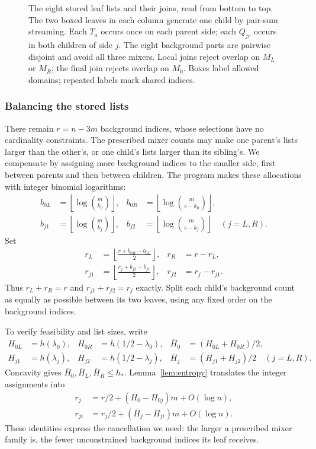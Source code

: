 \begin{figure}[htbp]
\begin{tabular}{@{}cccc@{}}
\end{tabular}
\caption{The eight stored leaf lists and their joins, read from bottom
 to top. The two boxed leaves in each column generate one child by
 pair-sum streaming. Each $T_a$ occurs once on each parent side;
 each $Q_{jr}$ occurs in both children of side $j$. The eight
 background parts are pairwise disjoint and avoid all three mixers.
 Local joins reject overlap on $M_L$ or $M_R$; the final join rejects
 overlap on $M_0$. Boxes label allowed domains; repeated labels mark shared indices.}
\label{tab:leaf-layout}
\end{figure}

\subsubsection*{Balancing the stored lists}

There remain $r=n-3m$ background indices, whose selections have no
cardinality constraints. The prescribed mixer counts may make one
parent's lists larger than the other's, or one child's lists larger
than its sibling's. We compensate by assigning more background indices
to the smaller side, first between parents and then between children.
The program makes these allocations with integer binomial logarithms:
\[
\begin{aligned}
 b_{0L}&=\left\lfloor\log \binom{m}{k_0}\right\rfloor,&
 b_{0R}&=\left\lfloor\log \binom{m}{s-k_0}\right\rfloor,\\
 b_{j1}&=\left\lfloor\log \binom{m}{k_j}\right\rfloor,&
 b_{j2}&=\left\lfloor\log \binom{m}{s-k_j}\right\rfloor
 \quad(j=L,R).
\end{aligned}
\]
Set
\[
\begin{aligned}
 r_L&=\left\lfloor\frac{r+b_{0R}-b_{0L}}2\right\rfloor,
 &r_R&=r-r_L,\\
 r_{j1}&=\left\lfloor\frac{r_j+b_{j2}-b_{j1}}2\right\rfloor,
 &r_{j2}&=r_j-r_{j1}.
\end{aligned}
\]
Thus $r_L+r_R=r$ and $r_{j1}+r_{j2}=r_j$ exactly. Split each
child's background count as equally as possible between its two leaves,
using any fixed order on the background indices.

To verify feasibility and list sizes, write
\[
\begin{aligned}
 H_{0L}&=h(\lambda_0),& H_{0R}&=h(1/2-\lambda_0),&
 \overline H_0&=(H_{0L}+H_{0R})/2,\\
 H_{j1}&=h(\lambda_j),& H_{j2}&=h(1/2-\lambda_j),&
 \overline H_j&=(H_{j1}+H_{j2})/2\quad(j=L,R).
\end{aligned}
\]
Concavity gives $\overline H_0,\overline H_L,\overline H_R\le h_*$.
Lemma~\ref{lem:entropy} translates the integer assignments into
\begin{equation}\label{eq:allocation}
\begin{split}
 r_j&=r/2+(\overline H_0-H_{0j})m+O(\log n),\\
 r_{ji}&=r_j/2+(\overline H_j-H_{ji})m+O(\log n).
\end{split}
\end{equation}
These identities express the cancellation we need: the larger a
prescribed mixer family is, the fewer unconstrained background indices
its leaf receives.

